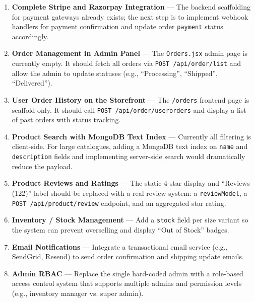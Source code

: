 \documentclass[12pt,a4paper]{report}
\begin{document}
\begin{enumerate}[leftmargin=*, label=\arabic*.]
  \item \textbf{Complete Stripe and Razorpay Integration} — The backend scaffolding for payment
        gateways already exists; the next step is to implement webhook handlers for payment
        confirmation and update order \texttt{payment} status accordingly.

  \item \textbf{Order Management in Admin Panel} — The \texttt{Orders.jsx} admin page is currently
        empty.
        It should fetch all orders via \texttt{POST /api/order/list} and allow the admin to
        update statuses (e.g., ``Processing'', ``Shipped'', ``Delivered'').

  \item \textbf{User Order History on the Storefront} — The \texttt{/orders} frontend page is
        scaffold-only.
        It should call \texttt{POST /api/order/userorders} and display a list of past orders
        with status tracking.

  \item \textbf{Product Search with MongoDB Text Index} — Currently all filtering is client-side.
        For large catalogues, adding a MongoDB text index on \texttt{name} and \texttt{description}
        fields and implementing server-side search would dramatically reduce the payload.

  \item \textbf{Product Reviews and Ratings} — The static 4-star display and ``Reviews (122)''
        label should be replaced with a real review system: a \texttt{reviewModel},
        a \texttt{POST /api/product/review} endpoint, and an aggregated star rating.

  \item \textbf{Inventory / Stock Management} — Add a \texttt{stock} field per size variant so
        the system can prevent overselling and display ``Out of Stock'' badges.

  \item \textbf{Email Notifications} — Integrate a transactional email service (e.g., SendGrid,
        Resend) to send order confirmation and shipping update emails.

  \item \textbf{Admin RBAC} — Replace the single hard-coded admin with a role-based access control
        system that supports multiple admins and permission levels
        (e.g., inventory manager vs. super admin).


\end{enumerate}
\end{document}

